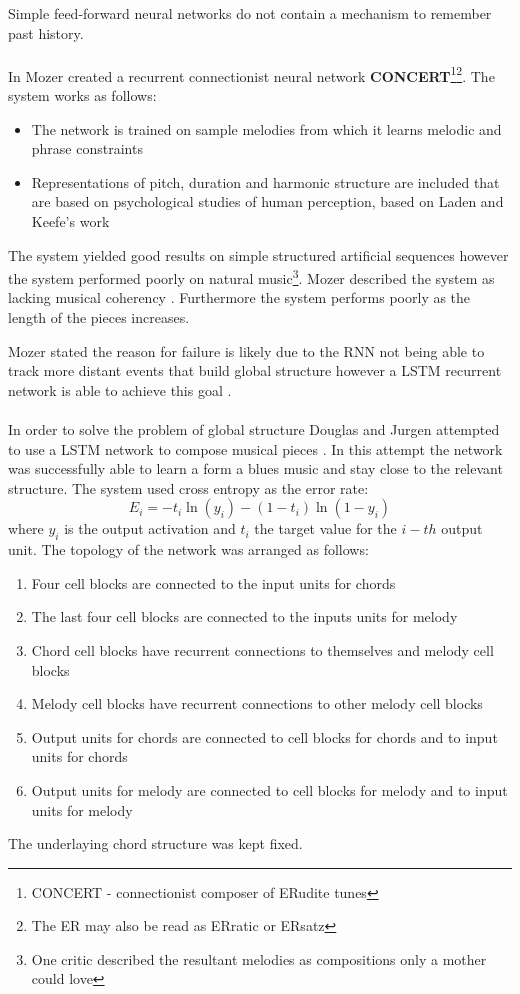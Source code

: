 Simple feed-forward neural networks do not contain a mechanism to remember past history.  
\\
\\
In \cite{mozer1994neural} Mozer created a recurrent connectionist neural network \textbf{CONCERT}\footnote{CONCERT - connectionist composer of ERudite tunes}\footnote{The ER may also be read as ERratic or ERsatz}.
The system works as follows:
\begin{itemize}
\item The network is trained on sample melodies from which it learns melodic and phrase constraints
\item Representations of pitch, duration and harmonic structure are included that are based on psychological studies of human perception, based on Laden and Keefe's work \cite{laden1989representation}
\end{itemize}
The system yielded good results on simple structured artificial sequences however the system performed poorly on natural music\footnote{One critic described the resultant melodies as compositions only a mother could love}. Mozer described the system as lacking musical coherency \cite{mozer1994neural}. Furthermore the system performs poorly as the length of the pieces increases.

Mozer stated the reason for failure is likely due to the \ac{RNN} not being able to track more distant events that build global structure \cite{mozer1994neural} however a \ac{LSTM} recurrent network is able to achieve this goal \cite{Eck2002}.
\\
\\
In order to solve the problem of global structure Douglas and Jurgen attempted to use a \ac{LSTM} network to compose musical pieces \cite{Eck2002}. In this attempt the network was successfully able to learn a form a blues music and stay close to the relevant structure.
The system used cross entropy as the error rate:
\[
E_i = -t_i \ln(y_i) - (1-t_i)\ln (1-y_i) \]
where $y_i$ is the output activation and $t_i$ the target value for the $i-th$ output unit.
The topology of the network was arranged as follows:
\begin{enumerate}
\item Four cell blocks are connected to the input units for chords
\item The last four cell blocks are connected to the inputs units for melody
\item Chord cell blocks have recurrent connections to themselves and melody cell blocks
\item Melody cell blocks have recurrent connections to other melody cell blocks
\item Output units for chords are connected to cell blocks for chords and to input units for chords
\item Output units for melody are connected to cell blocks for melody and to input units for melody
\end{enumerate}
The underlaying chord structure was kept fixed.

